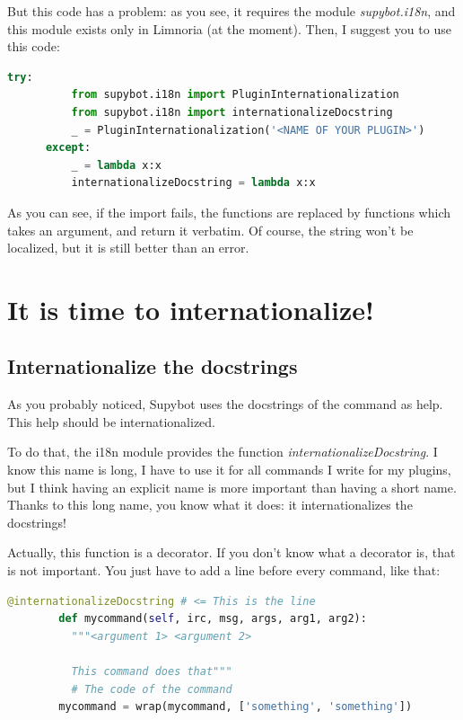 \documentclass[a4paper,11pt]{article}
\begin{document}
    But this code has a problem: as you see, it requires the module
    \emph{supybot.i18n}, and this module exists only in Limnoria (at the
    moment).
    Then, I suggest you to use this code:
    \begin{lstlisting}[language=python]
      try:
          from supybot.i18n import PluginInternationalization
          from supybot.i18n import internationalizeDocstring
          _ = PluginInternationalization('<NAME OF YOUR PLUGIN>')
      except:
          _ = lambda x:x
          internationalizeDocstring = lambda x:x
    \end{lstlisting}
    As you can see, if the import fails, the functions are replaced by
    functions which takes an argument, and return it verbatim.
    Of course, the string won't be localized, but it is still better than
    an error.
  
  \section{It is time to internationalize!}
    \subsection{Internationalize the docstrings}
      As you probably noticed, Supybot uses the docstrings of the command as
      help. This help should be internationalized.
      
      To do that, the i18n module provides the function
      \emph{internationalizeDocstring}. I know this name is long, I have to
      use it for all commands I write for my plugins, but I think having an
      explicit name is more important than having a short name. Thanks to
      this long name, you know what it does: it internationalizes the
      docstrings!
      
      Actually, this function is a decorator. If you don't know what a
      decorator is, that is not important. You just have to add a line
      before every command, like that:
      \begin{lstlisting}[language=python]
        @internationalizeDocstring # <= This is the line
        def mycommand(self, irc, msg, args, arg1, arg2):
          """<argument 1> <argument 2>
          
          This command does that"""
          # The code of the command
        mycommand = wrap(mycommand, ['something', 'something'])
      \end{lstlisting}
      
\end{document}
